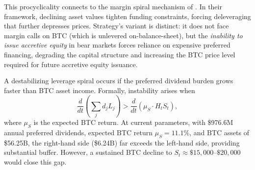 This procyclicality connects to the margin spiral mechanism of
\citet{brunnermeier2009market}. In their framework, declining asset
values tighten funding constraints, forcing deleveraging that further
depresses prices. Strategy's variant is distinct: it does not face
margin calls on BTC (which is unlevered on-balance-sheet), but the
\emph{inability to issue accretive equity} in bear markets forces
reliance on expensive preferred financing, degrading the capital
structure and increasing the BTC price level required for future
accretive equity issuance.

\begin{corollary}
\label{cor:leverage_spiral}
A destabilizing leverage spiral occurs if the preferred dividend burden
grows faster than BTC asset income. Formally, instability arises when
\begin{equation}
  \frac{d}{dt}\!\left(\sum_j d_j L_j\right) >
  \frac{d}{dt}\!\left(\mu_S \cdot H_t S_t\right),
  \label{eq:leverage_spiral}
\end{equation}
where $\mu_S$ is the expected BTC return. At current parameters,
with \$976.6M annual preferred dividends, expected BTC return
$\mu_S = 11.1\%$, and BTC assets of \$56.25B, the right-hand side
(\$6.24B) far exceeds the left-hand side, providing substantial buffer.
However, a sustained BTC decline to $S_t \approx \$15{,}000$--$\$20{,}000$
would close this gap.
\end{corollary}